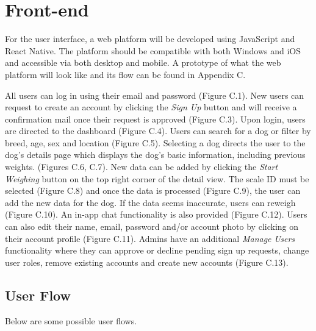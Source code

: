 \section{Front-end}
For the user interface, a web platform will be developed using JavaScript and React Native. The platform should be compatible with both Windows and iOS and accessible via both desktop and mobile. A prototype of what the web platform will look like and its flow can be found in  Appendix C.

All users can log in using their email and password (Figure C.1). New users can request to create an account by clicking the \textit{Sign Up} button and will receive a confirmation mail once their request is approved (Figure C.3). Upon login, users are directed to the dashboard (Figure C.4). Users can search for a dog or filter by breed, age, sex and location (Figure C.5). Selecting a dog directs the user to the dog's details page which displays the dog's basic information, including previous weights. (Figures C.6, C.7). New data can be added by clicking the \textit{Start Weighing} button on the top right corner of the detail view. The scale ID must be selected (Figure C.8) and once the data is processed (Figure C.9), the user can add the new data for the dog. If the data seems inaccurate, users can reweigh (Figure C.10). An in-app chat functionality is also provided (Figure C.12). Users can also edit their name, email, password and/or account photo by clicking on their account profile (Figure C.11). Admins have an additional \textit{Manage Users} functionality where they can approve or decline pending sign up requests, change user roles, remove existing accounts and create new accounts (Figure C.13). 

\subsection{User Flow}
Below are some possible user flows.



